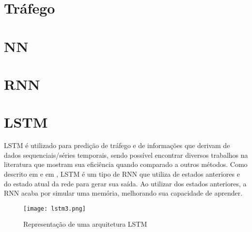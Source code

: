 
\section{Tráfego}


\section{\acrfull{NN}}


\section{\acrfull{RNN}}






\section{\acrfull{LSTM}}

\acrshort{LSTM} é utilizado para predição de tráfego e de informações que derivam de dados sequenciais/séries temporais, sendo possível encontrar diversos trabalhos na literatura que mostram sua eficiência quando comparado a outros métodos. Como descrito em \cite{Zainab_2018} e em \cite{Xiaolei_2015}, \acrshort{LSTM} é um tipo de \acrshort{RNN} que utiliza de estados anteriores e do estado atual da rede para gerar sua saída. Ao utilizar dos estados anteriores, a \acrshort{RNN} acaba por simular uma memória, melhorando sua capacidade de aprender. 

\begin{figure}[htb]
    \centering
    \texttt{[image: lstm3.png]}
    \label{figure:eixo}
    \caption[Representação de uma arquitetura LSTM]{Representação de uma arquitetura LSTM\footnotemark}
\end{figure}

